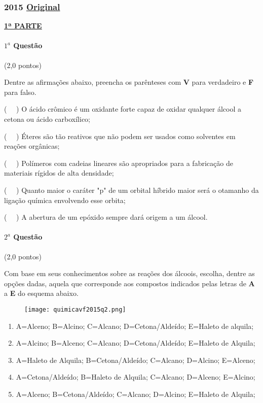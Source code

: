 \documentclass[12pt,a4paper]{article}
\newcommand{\original}[1]{\tiny \href{#1}{Original} \normalsize}
\begin{document}
\newpage

\subsubsection{2015 \original{https://drive.google.com/file/d/1RIAuxEyt3k5fJSYR7_shHYSQdcnjhRhJ/view?usp=sharing}}

\begin{center}
\underline{\textbf{1ª PARTE}}
\end{center}

\paragraph{$1^a$ Questão} (2,0 pontos)

Dentre as afirmações abaixo, preencha os parênteses com \textbf{V} para verdadeiro e \textbf{F} para falso.

( \  \ ) O ácido crômico é um oxidante forte capaz de oxidar qualquer álcool a cetona ou ácido carboxílico;

( \  \ ) Éteres são tão reativos que não podem ser usados como solventes em reações orgânicas;


( \  \ ) Polímeros com cadeias lineares são apropriados para a fabricação de materiais rígidos de alta densidade;


( \  \ ) Quanto maior o caráter "p" de um orbital híbrido maior será o otamanho da ligação química envolvendo esse orbita;


( \  \ ) A abertura de um epóxido sempre dará origem a um álcool.


\paragraph{$2^a$ Questão} (2,0 pontos)

Com base em seus conhecimentos sobre as reações dos álcoois, escolha, dentre as opções dadas, aquela que corresponde aos compostos 
indicados pelas letras de \textbf{A} a \textbf{E} do esquema abaixo. 
\begin{figure}[ht]
\centering
\texttt{[image: quimicavf2015q2.png]}
\end{figure}

\begin{enumerate}[label=\alph*)]
\item \footnotesize{A=Alceno; B=Alcino; C=Alcano; D=Cetona/Aldeído; E=Haleto de alquila;}
\item \footnotesize{A=Alcino; B=Alceno; C=Alcano; D=Cetona/Aldeído; E=Haleto de Alquila; }
\item \footnotesize{A=Haleto de Alquila; B=Cetona/Aldeído; C=Alcano; D=Alcino; E=Alceno;}
\item \footnotesize{A=Cetona/Aldeído; B=Haleto de Alquila; C=Alcano; D=Alceno; E=Alcino;}
\item \footnotesize{A=Alceno; B=Cetona/Aldeído; C=Alcano; D=Alcino; E=Haleto de Alquila;}
\end{enumerate}
\end{document}
